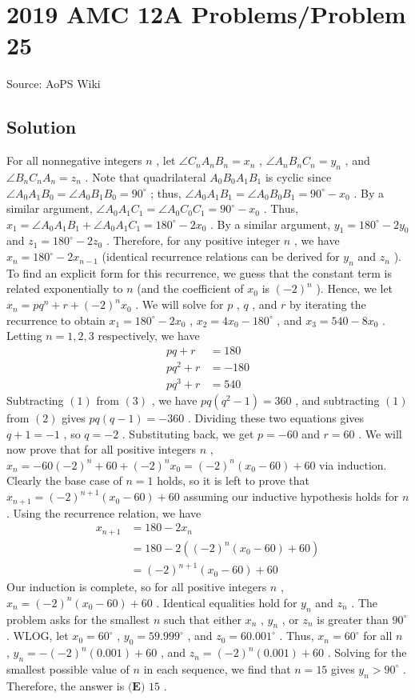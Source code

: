 \documentclass[12pt]{article}
\begin{document}
\section*{{2019 AMC 12A Problems/Problem 25}}
Source: AoPS Wiki

\subsection*{Solution}
For all nonnegative integers $n$ , let $\angle C_nA_nB_n=x_n$ , $\angle A_nB_nC_n=y_n$ , and $\angle B_nC_nA_n=z_n$ . Note that quadrilateral $A_0B_0A_1B_1$ is cyclic since $\angle A_0A_1B_0=\angle A_0B_1B_0=90^\circ$ ; thus, $\angle A_0A_1B_1=\angle A_0B_0B_1=90^\circ-x_0$ . By a similar argument, $\angle A_0A_1C_1=\angle A_0C_0C_1=90^\circ-x_0$ . Thus, $x_1=\angle A_0A_1B_1+\angle A_0A_1C_1=180^\circ-2x_0$ . By a similar argument, $y_1=180^\circ-2y_0$ and $z_1=180^\circ-2z_0$ . Therefore, for any positive integer $n$ , we have $x_n=180^\circ-2x_{n-1}$ (identical recurrence relations can be derived for $y_n$ and $z_n$ ). To find an explicit form for this recurrence, we guess that the constant term is related exponentially to $n$ (and the coefficient of $x_0$ is $(-2)^n$ ). Hence, we let $x_n=pq^n+r+(-2)^nx_0$ . We will solve for $p$ , $q$ , and $r$ by iterating the recurrence to obtain $x_1=180^\circ-2x_0$ , $x_2=4x_0-180^\circ$ , and $x_3=540-8x_0$ . Letting $n=1,2,3$ respectively, we have \begin{align} pq+r&=180 \\ pq^2+r&=-180 \\ pq^3+r&=540 \end{align} Subtracting $(1)$ from $(3)$ , we have $pq(q^2-1)=360$ , and subtracting $(1)$ from $(2)$ gives $pq(q-1)=-360$ . Dividing these two equations gives $q+1=-1$ , so $q=-2$ . Substituting back, we get $p=-60$ and $r=60$ . We will now prove that for all positive integers $n$ , $x_n=-60(-2)^n+60+(-2)^nx_0=(-2)^n(x_0-60)+60$ via induction. Clearly the base case of $n=1$ holds, so it is left to prove that $x_{n+1}=(-2)^{n+1}(x_0-60)+60$ assuming our inductive hypothesis holds for $n$ . Using the recurrence relation, we have \begin{align*} x_{n+1}&=180-2x_n \\ &=180-2((-2)^n(x_0-60)+60) \\ &=(-2)^{n+1}(x_0-60)+60 \end{align*} Our induction is complete, so for all positive integers $n$ , $x_n=(-2)^n(x_0-60)+60$ . Identical equalities hold for $y_n$ and $z_n$ . The problem asks for the smallest $n$ such that either $x_n$ , $y_n$ , or $z_n$ is greater than $90^\circ$ . WLOG, let $x_0=60^\circ$ , $y_0=59.999^\circ$ , and $z_0=60.001^\circ$ . Thus, $x_n=60^\circ$ for all $n$ , $y_n=-(-2)^n(0.001)+60$ , and $z_n=(-2)^n(0.001)+60$ . Solving for the smallest possible value of $n$ in each sequence, we find that $n=15$ gives $y_n>90^\circ$ . Therefore, the answer is $\boxed{\textbf{(E) } 15}$ .
\end{document}
